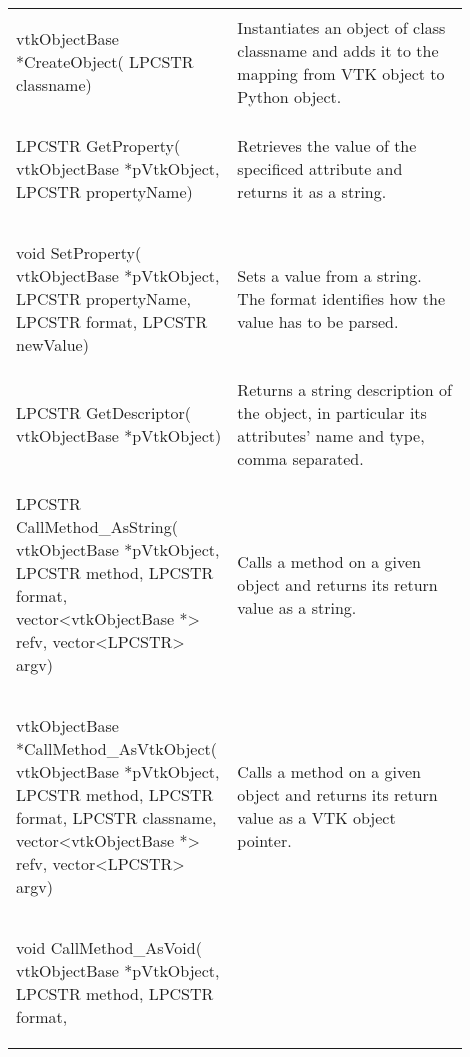 \begin{appendices}
\begin{landscape}
	\begin{longtable}[c]{
			>{\raggedright\arraybackslash}p{0.4\linewidth}
			>{\raggedright\arraybackslash}p{0.5\linewidth}
		}
		\multicolumn{1}{c}{\textbf{Function signature}} &
		\multicolumn{1}{c}{\textbf{Explenation}} 
		\\ \hline
	\endhead
	\begin{codify}
	vtkObjectBase *CreateObject(
		LPCSTR classname)
	\end{codify} &
	Instantiates an object of class classname and adds it to the mapping from VTK object to Python object.
	\\
	\begin{codify}
	LPCSTR GetProperty(
		vtkObjectBase *pVtkObject,
		LPCSTR propertyName)
	\end{codify} &
	Retrieves the value of the specificed attribute and returns it as a string.
	\\
	\begin{codify}
	void SetProperty(
		vtkObjectBase *pVtkObject,
		LPCSTR propertyName,
		LPCSTR format,
		LPCSTR newValue)
	\end{codify} &
	Sets a value from a string. The format identifies how the value has to be parsed.
	\\
	\begin{codify}
	LPCSTR GetDescriptor(
		vtkObjectBase *pVtkObject)
	\end{codify} &
	Returns a string description of the object, in particular its attributes' name and type, comma separated.
	\\
	\begin{codify}
	LPCSTR CallMethod_AsString(
		vtkObjectBase *pVtkObject,
		LPCSTR method,
		LPCSTR format,
		vector<vtkObjectBase *> refv,
		vector<LPCSTR> argv)
	\end{codify} &
	Calls a method on a given object and returns its return value as a string.
	\\
	\begin{codify}
	vtkObjectBase *CallMethod_AsVtkObject(
		vtkObjectBase *pVtkObject,
		LPCSTR method,
		LPCSTR format,
		LPCSTR classname,
		vector<vtkObjectBase *> refv,
		vector<LPCSTR> argv)
	\end{codify} &
	Calls a method on a given object and returns its return value as a VTK object pointer.
	\\
	\begin{codify}
	void CallMethod_AsVoid(
		vtkObjectBase *pVtkObject,
		LPCSTR method,
		LPCSTR format,

\end{codify}
\end{longtable}
\end{landscape}
\end{appendices}
